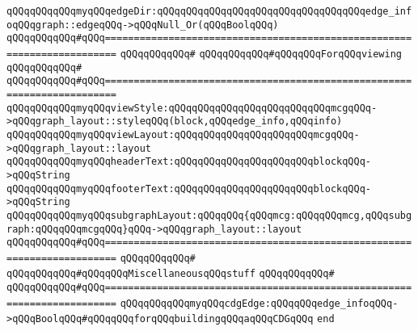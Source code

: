 \verb|qQQqqQQqqQQqmyqQQqedgeDir:qQQqqQQqqQQqqQQqqQQqqQQqqQQqqQQqqQQqedge_infoqQQqgraph::edgeqQQq->qQQqNull_Or(qQQqBoolqQQq)|\newline
\newline
\verb|qQQqqQQqqQQq#qQQq========================================================================|\newline
\verb|qQQqqQQqqQQq#|\newline
\verb|qQQqqQQqqQQq#qQQqqQQqForqQQqviewing|\newline
\verb|qQQqqQQqqQQq#|\newline
\verb|qQQqqQQqqQQq#qQQq========================================================================|\newline
\verb|qQQqqQQqqQQqmyqQQqviewStyle:qQQqqQQqqQQqqQQqqQQqqQQqqQQqmcgqQQq->qQQqgraph_layout::styleqQQq(block,qQQqedge_info,qQQqinfo)|\newline
\verb|qQQqqQQqqQQqmyqQQqviewLayout:qQQqqQQqqQQqqQQqqQQqqQQqmcgqQQq->qQQqgraph_layout::layout|\newline
\verb|qQQqqQQqqQQqmyqQQqheaderText:qQQqqQQqqQQqqQQqqQQqqQQqblockqQQq->qQQqString|\newline
\verb|qQQqqQQqqQQqmyqQQqfooterText:qQQqqQQqqQQqqQQqqQQqqQQqblockqQQq->qQQqString|\newline
\verb|qQQqqQQqqQQqmyqQQqsubgraphLayout:qQQqqQQq{qQQqmcg:qQQqqQQqmcg,qQQqsubgraph:qQQqqQQqmcgqQQq}qQQq->qQQqgraph_layout::layout|\newline
\newline
\verb|qQQqqQQqqQQq#qQQq========================================================================|\newline
\verb|qQQqqQQqqQQq#|\newline
\verb|qQQqqQQqqQQq#qQQqqQQqMiscellaneousqQQqstuff|\newline
\verb|qQQqqQQqqQQq#|\newline
\verb|qQQqqQQqqQQq#qQQq========================================================================|\newline
\verb|qQQqqQQqqQQqmyqQQqcdgEdge:qQQqqQQqedge_infoqQQq->qQQqBoolqQQq#qQQqqQQqforqQQqbuildingqQQqaqQQqCDGqQQq|\newline
\newline
\verb|end|\newline
\newline

